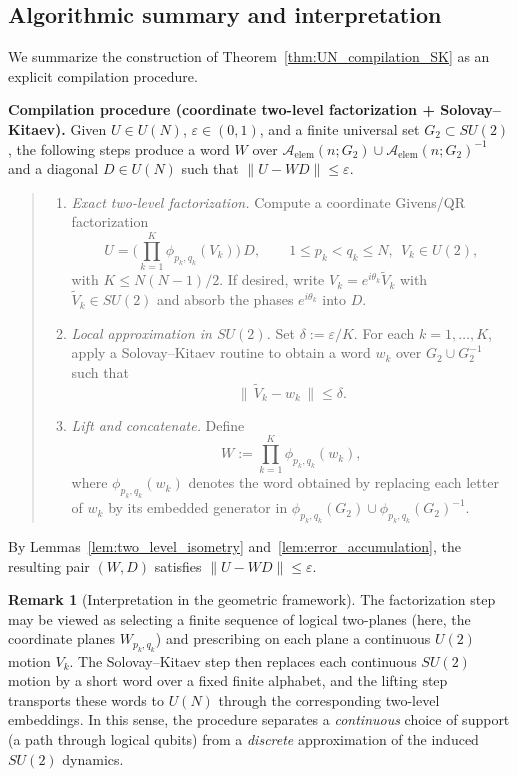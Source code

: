 \documentclass{article}%
\theoremstyle{definition}
\newtheorem{remark}[theorem]{Remark}
\numberwithin{equation}{section}
\begin{document}
\subsection{Algorithmic summary and interpretation}
\label{subsec:algorithmic_summary}

We summarize the construction of Theorem~\ref{thm:UN_compilation_SK} as an explicit compilation procedure.

\medskip
\noindent\textbf{Compilation procedure (coordinate two-level factorization + Solovay--Kitaev).}
Given $U\in U(N)$, $\varepsilon\in(0,1)$, and a finite universal set $G_2\subset SU(2)$, the following steps produce
a word $W$ over $\mathcal{A}_{\mathrm{elem}}(n;G_2)\cup\mathcal{A}_{\mathrm{elem}}(n;G_2)^{-1}$ and a diagonal $D\in U(N)$ such that
$\|U-WD\|\le \varepsilon$.

\begin{quote}
\begin{enumerate}
\item \emph{Exact two-level factorization.}
Compute a coordinate Givens/QR factorization
\[
U=\Big(\prod_{k=1}^{K}\phi_{p_k,q_k}(V_k)\Big)\,D,
\qquad 1\le p_k<q_k\le N,\ \ V_k\in U(2),
\]
with $K\le N(N-1)/2$.
If desired, write $V_k=e^{i\theta_k}\widetilde V_k$ with $\widetilde V_k\in SU(2)$ and absorb the phases $e^{i\theta_k}$ into $D$.

\item \emph{Local approximation in $SU(2)$.}
Set $\delta:=\varepsilon/K$.
For each $k=1,\dots,K$, apply a Solovay--Kitaev routine to obtain a word $w_k$ over $G_2\cup G_2^{-1}$ such that
\[
\|\,\widetilde V_k-w_k\,\|\le \delta.
\]

\item \emph{Lift and concatenate.}
Define
\[
W:=\prod_{k=1}^{K}\phi_{p_k,q_k}(w_k),
\]
where $\phi_{p_k,q_k}(w_k)$ denotes the word obtained by replacing each letter of $w_k$ by its embedded generator in
$\phi_{p_k,q_k}(G_2)\cup \phi_{p_k,q_k}(G_2)^{-1}$.
\end{enumerate}
\end{quote}

\noindent
By Lemmas~\ref{lem:two_level_isometry} and~\ref{lem:error_accumulation}, the resulting pair $(W,D)$ satisfies $\|U-WD\|\le\varepsilon$.
\medskip

\begin{remark}[Interpretation in the geometric framework]
The factorization step may be viewed as selecting a finite sequence of logical two-planes (here, the coordinate planes
$W_{p_k,q_k}$) and prescribing on each plane a continuous $U(2)$ motion $V_k$. The Solovay--Kitaev step then replaces each
continuous $SU(2)$ motion by a short word over a fixed finite alphabet, and the lifting step transports these words to $U(N)$ through
the corresponding two-level embeddings. In this sense, the procedure separates a \emph{continuous} choice of support (a path through
logical qubits) from a \emph{discrete} approximation of the induced $SU(2)$ dynamics.
\end{remark}
\end{document}
